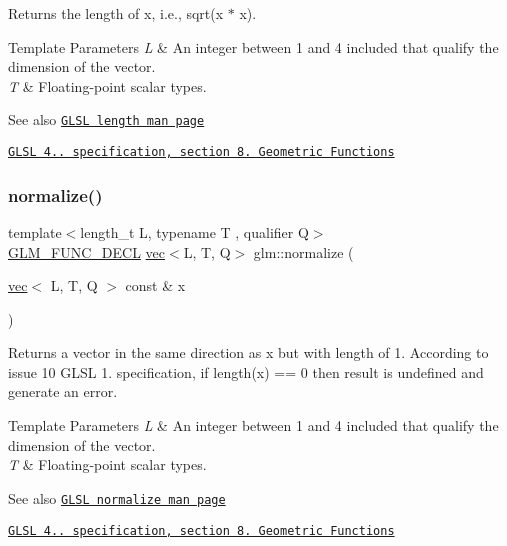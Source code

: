 Returns the length of x, i.\+e., sqrt(x $\ast$ x).


\begin{DoxyTemplParams}{Template Parameters}
{\em L} & An integer between 1 and 4 included that qualify the dimension of the vector. \\
\hline
{\em T} & Floating-\/point scalar types.\\
\hline
\end{DoxyTemplParams}
\begin{DoxySeeAlso}{See also}
\href{http://www.opengl.org/sdk/docs/manglsl/xhtml/length.xml}{\tt G\+L\+SL length man page} 

\href{http://www.opengl.org/registry/doc/GLSLangSpec.4.20.8.pdf}{\tt G\+L\+SL 4.. specification, section 8. Geometric Functions} 
\end{DoxySeeAlso}
\mbox{\label{group__core__func__geometric_ga3b8d3dcae77870781392ed2902cce597}} 
\subsubsection{\texorpdfstring{normalize()}{normalize()}}
{\footnotesize\ttfamily template$<$length\+\_\+t L, typename T , qualifier Q$>$ \\
\mbox{\hyperlink{setup_8hpp_ab2d052de21a70539923e9bcbf6e83a51}{G\+L\+M\+\_\+\+F\+U\+N\+C\+\_\+\+D\+E\+CL}} \mbox{\hyperlink{structglm_1_1vec}{vec}}$<$L, T, Q$>$ glm\+::normalize (\begin{DoxyParamCaption}\item[{\mbox{\hyperlink{structglm_1_1vec}{vec}}$<$ L, T, Q $>$ const \&}]{x }\end{DoxyParamCaption})}

Returns a vector in the same direction as x but with length of 1. According to issue 10 G\+L\+SL 1. specification, if length(x) == 0 then result is undefined and generate an error.


\begin{DoxyTemplParams}{Template Parameters}
{\em L} & An integer between 1 and 4 included that qualify the dimension of the vector. \\
\hline
{\em T} & Floating-\/point scalar types.\\
\hline
\end{DoxyTemplParams}
\begin{DoxySeeAlso}{See also}
\href{http://www.opengl.org/sdk/docs/manglsl/xhtml/normalize.xml}{\tt G\+L\+SL normalize man page} 

\href{http://www.opengl.org/registry/doc/GLSLangSpec.4.20.8.pdf}{\tt G\+L\+SL 4.. specification, section 8. Geometric Functions} 
\end{DoxySeeAlso}
\mbox{\label{group__core__func__geometric_ga5631dd1d5618de5450b1ea3cf3e94905}} 
